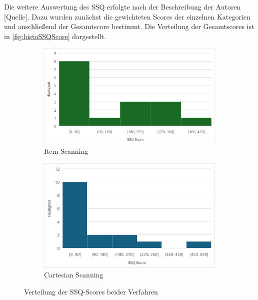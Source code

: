Die weitere Auswertung des SSQ erfolgte nach der Beschreibung der Autoren [Quelle]. Dazu wurden zunächst die gewichteten Scores der einzelnen Kategorien und anschließend der Gesamtscore bestimmt. Die Verteilung der Gesamtscores ist in \autoref{fig:histoSSQScore} dargestellt. 

\begin{figure}
    \centering
    \begin{subfigure}{.5\textwidth}
        \centering
        \includegraphics[width=0.99\textwidth]{images/Results/Histogramm-SSQScores-Item.png}
        \caption{Item Scanning}
        \label{fig:histoSSQItem}   
    \end{subfigure}%
    \begin{subfigure}{.5\textwidth}
        \centering
        \includegraphics[width=0.99\textwidth]{images/Results/Histogramm-SSQScores-Cartesian.png}
         \caption{Cartesian Scanning}
         \label{fig:histoSSQCartesian}
    \end{subfigure}
    \caption{Verteilung der SSQ-Scores beider Verfahren}
    \label{fig:histoSSQScore}
\end{figure}

